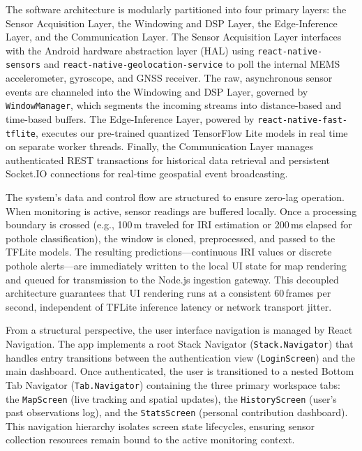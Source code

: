 \documentclass[conference]{IEEEtran}
\begin{document}
The software architecture is modularly partitioned into four primary layers: the Sensor Acquisition Layer, the Windowing and DSP Layer, the Edge-Inference Layer, and the Communication Layer. The Sensor Acquisition Layer interfaces with the Android hardware abstraction layer (HAL) using \texttt{react-native-sensors} and \texttt{react-native-geolocation-service} to poll the internal MEMS accelerometer, gyroscope, and GNSS receiver. The raw, asynchronous sensor events are channeled into the Windowing and DSP Layer, governed by \texttt{WindowManager}, which segments the incoming streams into distance-based and time-based buffers. The Edge-Inference Layer, powered by \texttt{react-native-fast-tflite}, executes our pre-trained quantized TensorFlow Lite models in real time on separate worker threads. Finally, the Communication Layer manages authenticated REST transactions for historical data retrieval and persistent Socket.IO connections for real-time geospatial event broadcasting.

The system's data and control flow are structured to ensure zero-lag operation. When monitoring is active, sensor readings are buffered locally. Once a processing boundary is crossed (e.g., 100\,m traveled for IRI estimation or 200\,ms elapsed for pothole classification), the window is cloned, preprocessed, and passed to the TFLite models. The resulting predictions---continuous IRI values or discrete pothole alerts---are immediately written to the local UI state for map rendering and queued for transmission to the Node.js ingestion gateway. This decoupled architecture guarantees that UI rendering runs at a consistent 60\,frames per second, independent of TFLite inference latency or network transport jitter.

From a structural perspective, the user interface navigation is managed by React Navigation. The app implements a root Stack Navigator (\texttt{Stack.Navigator}) that handles entry transitions between the authentication view (\texttt{LoginScreen}) and the main dashboard. Once authenticated, the user is transitioned to a nested Bottom Tab Navigator (\texttt{Tab.Navigator}) containing the three primary workspace tabs: the \texttt{MapScreen} (live tracking and spatial updates), the \texttt{HistoryScreen} (user's past observations log), and the \texttt{StatsScreen} (personal contribution dashboard). This navigation hierarchy isolates screen state lifecycles, ensuring sensor collection resources remain bound to the active monitoring context.


\end{document}
